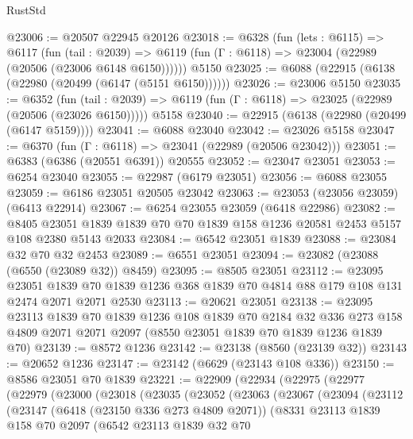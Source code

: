 \begin{lexlean}{RustStd}
\begin{coremodule}
@23006 := @20507 @22945 @20126
@23018 := @6328
    (fun (lets : @6115) =>
    @6117
      (fun (tail : @2039) =>
      @6119 (fun (Γ : @6118) => @23004 (@22989 (@20506 (@23006 @6148 @6150))))))
    @5150
@23025 := @6088 (@22915 (@6138 (@22980 (@20499 (@6147 (@5151 @6150))))))
@23026 := @23006 @5150
@23035 := @6352
    (fun (tail : @2039) => @6119 (fun (Γ : @6118) => @23025 (@22989 (@20506 (@23026 @6150)))))
    @5158
@23040 := @22915 (@6138 (@22980 (@20499 (@6147 @5159))))
@23041 := @6088 @23040
@23042 := @23026 @5158
@23047 := @6370 (fun (Γ : @6118) => @23041 (@22989 (@20506 @23042)))
@23051 := @6383 (@6386 (@20551 @6391)) @20555
@23052 := @23047 @23051
@23053 := @6254 @23040
@23055 := @22987 (@6179 @23051)
@23056 := @6088 @23055
@23059 := @6186 @23051 @20505 @23042
@23063 := @23053 (@23056 @23059) (@6413 @22914)
@23067 := @6254 @23055 @23059 (@6418 @22986)
@23082 := @8405
    @23051
    @1839
    @1839
    @70
    @70
    @1839
    @158
    @1236
    @20581
    @2453
    @5157
    @108
    @2380
    @5143
    @2033
@23084 := @6542 @23051 @1839
@23088 := @23084 @32 @70 @32 @2453
@23089 := @6551 @23051
@23094 := @23082 (@23088 (@6550 (@23089 @32)) @8459)
@23095 := @8505 @23051
@23112 := @23095
    @23051
    @1839
    @70
    @1839
    @1236
    @368
    @1839
    @70
    @4814
    @88
    @179
    @108
    @131
    @2474
    @2071
    @2071
    @2530
@23113 := @20621 @23051
@23138 := @23095
    @23113
    @1839
    @70
    @1839
    @1236
    @108
    @1839
    @70
    @2184
    @32
    @336
    @273
    @158
    @4809
    @2071
    @2071
    @2097
    (@8550 @23051 @1839 @70 @1839 @1236 @1839 @70)
@23139 := @8572 @1236
@23142 := @23138 (@8560 (@23139 @32))
@23143 := @20652 @1236
@23147 := @23142 (@6629 (@23143 @108 @336))
@23150 := @8586 @23051 @70 @1839
@23221 := @22909
    (@22934
      (@22975
        (@22977
          (@22979
            (@23000
              (@23018
                (@23035
                  (@23052
                    (@23063
                      (@23067
                        (@23094
                          (@23112
                            (@23147
                              (@6418 (@23150 @336 @273 @4809 @2071))
                              (@8331
                                @23113
                                @1839
                                @158
                                @70
                                @2097
                                (@6542
                                  @23113
                                  @1839
                                  @32
                                  @70

\end{coremodule}
\end{lexlean}
